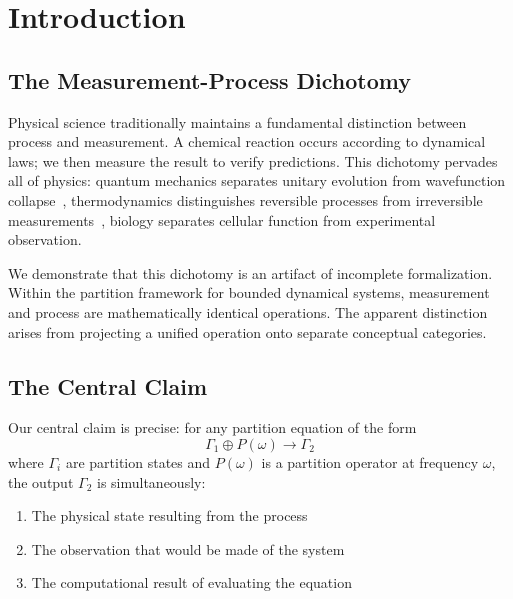 \documentclass[aps,prd,twocolumn,superscriptaddress,floatfix,nofootinbib]{revtex4-2}
\theoremstyle{remark}
\newcommand{\Pop}{P}
\newcommand{\Gstate}{\Gamma}
\newcommand{\kB}{k_{\mathrm{B}}}
\begin{document}
\begin{abstract}
processes demonstrates quantitative agreement with experimental data using only fundamental constants ($e$, $\kB$, $\hbar$, $c$). The framework establishes cellular computation as observational algebra: cells execute partition equations whose outputs are simultaneously physical states, observations, and diagnostic measurements.
\end{abstract}

\maketitle

\section{Introduction}
\label{sec:introduction}

\subsection{The Measurement-Process Dichotomy}

Physical science traditionally maintains a fundamental distinction between process and measurement. A chemical reaction occurs according to dynamical laws; we then measure the result to verify predictions. This dichotomy pervades all of physics: quantum mechanics separates unitary evolution from wavefunction collapse~\cite{vonneumann1932,wheeler1983}, thermodynamics distinguishes reversible processes from irreversible measurements~\cite{landauer1961}, biology separates cellular function from experimental observation.

We demonstrate that this dichotomy is an artifact of incomplete formalization. Within the partition framework for bounded dynamical systems, measurement and process are mathematically identical operations. The apparent distinction arises from projecting a unified operation onto separate conceptual categories.

\subsection{The Central Claim}

Our central claim is precise: for any partition equation of the form
\begin{equation}
\Gstate_1 \oplus \Pop(\omega) \to \Gstate_2
\label{eq:central_form}
\end{equation}
where $\Gstate_i$ are partition states and $\Pop(\omega)$ is a partition operator at frequency $\omega$, the output $\Gstate_2$ is simultaneously:
\begin{enumerate}
\item The physical state resulting from the process
\item The observation that would be made of the system
\item The computational result of evaluating the equation
\end{enumerate}
\end{document}
